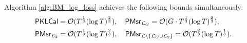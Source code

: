 \begin{corollary}
  \label{cor:simultaneous_bounds_psreg}
    Algorithm \ref{alg:BM_log_loss} achieves the following bounds simultaneously: \begin{align*}&{{\pkcal}} = \cO(T^{\frac{1}{3}} (\log T) ^ {\frac{2}{3}}), \quad {\mpsr_{\cL_{G}}} = \cO(G \cdot T^{\frac{1}{3}} (\log T) ^ {\frac{2}{3}}), \\ 
    & {\mpsr_{\cL_{2}}} = \cO(T^{\frac{1}{3}} (\log T) ^ {\frac{2}{3}}), \quad
    {\mpsr_{\cL\backslash\{\cL_{G} \cup \cL_{2}\}}} = \cO(T^{\frac{2}{3}} (\log T) ^ {\frac{1}{3}}).\end{align*}
\end{corollary}
